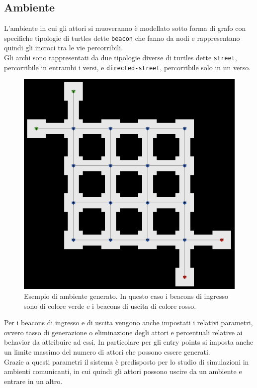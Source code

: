 \subsection{Ambiente}
L'ambiente in cui gli attori si muoveranno è modellato sotto forma di grafo con specifiche tipologie di turtles dette \texttt{beacon} che fanno da nodi e rappresentano quindi gli incroci tra le vie percorribili.\\
Gli archi sono rappresentati da due tipologie diverse di turtles dette \texttt{street}, percorribile in entrambi i versi, e \texttt{directed-street}, percorribile solo in un verso.\\
\begin{figure}[htbp]
\centering
\includegraphics[width=\textwidth,height=\textheight,keepaspectratio]{images/ambiente-screen.png}
\caption{Esempio di ambiente generato. In questo caso i beacons di ingresso sono di colore verde e i beacons di uscita di colore rosso.}
\label{fig:ambiente-screen}
\end{figure}
Per i beacons di ingresso e di uscita vengono anche impostati i relativi parametri, ovvero tasso di generazione o eliminazione degli attori e percentuali relative ai behavior da attribuire ad essi. In particolare per gli entry points si imposta anche un limite massimo del numero di attori che possono essere generati.\\
Grazie a questi parametri il sistema è predisposto per lo studio di simulazioni in ambienti comunicanti, in cui quindi gli attori possono uscire da un ambiente e entrare in un altro. 
